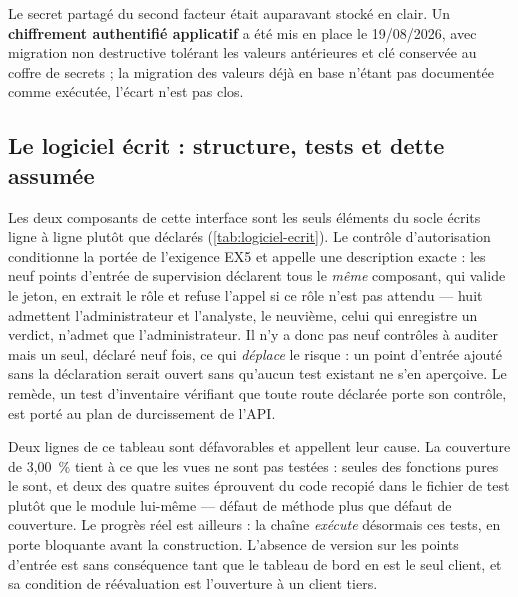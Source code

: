 Le secret partagé du second facteur était auparavant stocké en clair. Un \textbf{chiffrement
authentifié applicatif} a été mis en place le 19/08/2026, avec migration non destructive tolérant
les valeurs antérieures et clé conservée au coffre de secrets ; la migration des valeurs déjà en
base n'étant pas documentée comme exécutée, l'écart n'est pas clos.

\subsection{Le logiciel écrit : structure, tests et dette assumée}
\label{subsec:logiciel-ecrit}

Les deux composants de cette interface sont les seuls éléments du socle écrits ligne à ligne plutôt
que déclarés (\cref{tab:logiciel-ecrit}). Le contrôle d'autorisation conditionne la portée de
l'exigence EX5 et appelle une description exacte : les neuf points d'entrée de supervision déclarent
tous le \emph{même} composant, qui valide le jeton, en extrait le rôle et refuse l'appel si ce rôle
n'est pas attendu --- huit admettent l'administrateur et l'analyste, le neuvième, celui qui
enregistre un verdict, n'admet que l'administrateur. Il n'y a donc pas neuf contrôles à auditer mais
un seul, déclaré neuf fois, ce qui \emph{déplace} le risque : un point d'entrée ajouté sans la
déclaration serait ouvert sans qu'aucun test existant ne s'en aperçoive. Le remède, un test
d'inventaire vérifiant que toute route déclarée porte son contrôle, est porté au plan de
durcissement de l'API.


Deux lignes de ce tableau sont défavorables et appellent leur cause. La couverture de 3,00~\% tient
à ce que les vues ne sont pas testées : seules des fonctions pures le sont, et deux des quatre suites
éprouvent du code recopié dans le fichier de test plutôt que le module lui-même --- défaut de méthode
plus que défaut de couverture. Le progrès réel est ailleurs : la chaîne \emph{exécute} désormais ces
tests, en porte bloquante avant la construction. L'absence de version sur les points d'entrée est
sans conséquence tant que le tableau de bord en est le seul client, et sa condition de réévaluation
est l'ouverture à un client tiers.

